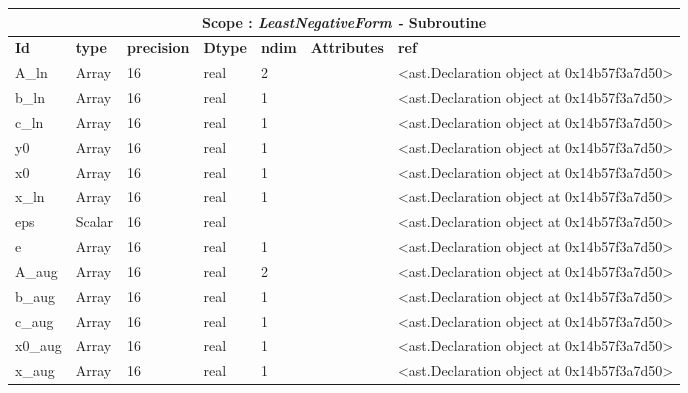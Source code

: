 \documentclass{report}
\begin{document}
\begin{center}
\begin{longtable}{|p{3.5cm}|p{1.5cm}|p{1.5cm}|p{1.5cm}|p{1cm}|p{2cm}|p{4cm}| }
\hline
\multicolumn{7}{|c|}{\textbf{Scope : \qquad}  \textbf{\textit{LeastNegativeForm - }Subroutine}}\\ 
\hline
\textbf{Id} & \textbf{type} & \textbf{precision} & \textbf{Dtype} & \textbf{ndim} & \textbf{Attributes} & \textbf{ref} \\\hline

A\_ln & Array & 16 & real & 2 &  & <ast.Declaration object at 0x14b57f3a7d50> \\\hline

b\_ln & Array & 16 & real & 1 &  & <ast.Declaration object at 0x14b57f3a7d50> \\\hline

c\_ln & Array & 16 & real & 1 &  & <ast.Declaration object at 0x14b57f3a7d50> \\\hline

y0 & Array & 16 & real & 1 &  & <ast.Declaration object at 0x14b57f3a7d50> \\\hline

x0 & Array & 16 & real & 1 &  & <ast.Declaration object at 0x14b57f3a7d50> \\\hline

x\_ln & Array & 16 & real & 1 &  & <ast.Declaration object at 0x14b57f3a7d50> \\\hline

eps & Scalar & 16 & real &  &  & <ast.Declaration object at 0x14b57f3a7d50> \\\hline

e & Array & 16 & real & 1 &  & <ast.Declaration object at 0x14b57f3a7d50> \\\hline

A\_aug & Array & 16 & real & 2 &  & <ast.Declaration object at 0x14b57f3a7d50> \\\hline

b\_aug & Array & 16 & real & 1 &  & <ast.Declaration object at 0x14b57f3a7d50> \\\hline

c\_aug & Array & 16 & real & 1 &  & <ast.Declaration object at 0x14b57f3a7d50> \\\hline

x0\_aug & Array & 16 & real & 1 &  & <ast.Declaration object at 0x14b57f3a7d50> \\\hline

x\_aug & Array & 16 & real & 1 &  & <ast.Declaration object at 0x14b57f3a7d50> \\\hline


\end{longtable}
\end{center}
\end{document}
